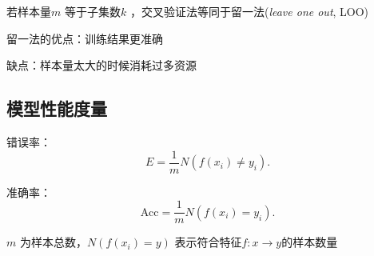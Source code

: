 \begin{notation}
    若样本量$m$ 等于子集数$k$ ，交叉验证法等同于留一法(\textit{leave one out}, LOO)

    留一法的优点：训练结果更准确

    缺点：样本量太大的时候消耗过多资源
\end{notation}
\subsection{模型性能度量}%
\label{sub:模型性能度量}
\begin{notation}
    错误率：\[
        E=\frac{1}{m} N\left( f\left( x_{i} \right) \neq y_{i} \right) 
    .\] 

    准确率：\[
        \text{Acc}=\frac{1}{m} N\left( f\left( x_{i} \right) =y_{i} \right) 
    .\] 

    $m$ 为样本总数，$N\left( f\left( x_{i} \right) =y \right) $ 表示符合特征$f:x\to y$的样本数量
\end{notation}
